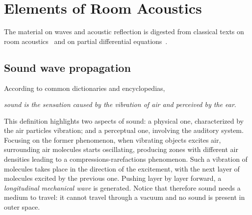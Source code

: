 \chapter{Elements of Room Acoustics}\label{ch:acoustics}

\vspace{-2.5em}
\synopsisChAcoustics

\mynewline
The material on waves and acoustic reflection is digested from classical texts on room acoustics~ and on partial differential equations~.


\section{Sound wave propagation}\label{ch:acoustics:sec:wave}%
According to common dictionaries and encyclopedias,
\begin{center}
    \textit{sound is the sensation caused by the vibration of air and perceived by the ear}.
\end{center}
This definition highlights two aspects of sound: a physical one, characterized by the air particles vibration; and a perceptual one, involving the auditory system.
Focusing on the former phenomenon, when vibrating objects excites air, surrounding air molecules starts oscillating,
producing zones with different air densities leading to a compressions-rarefactions phenomenon.
Such a vibration of molecules takes place in the direction of the excitement, with the next layer of molecules excited by the previous one.
Pushing layer by layer forward, a \textit{longitudinal mechanical wave} is generated.
Notice that therefore sound needs a medium to travel: it cannot travel through a vacuum and no sound is present in outer space.
